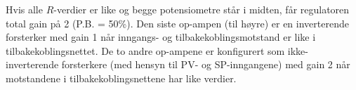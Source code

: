 \vskip 10pt

Hvis alle $R$-verdier er like og begge potensiometre står i midten, får regulatoren total gain på 2 (P.B. = 50\%). Den siste op-ampen (til høyre) er en inverterende forsterker med gain 1 når inngangs- og tilbakekoblingsmotstand er like i tilbakekoblingsnettet. De to andre op-ampene er konfigurert som ikke-inverterende forsterkere (med hensyn til PV- og SP-inngangene) med gain 2 når motstandene i tilbakekoblingsnettene har like verdier.



